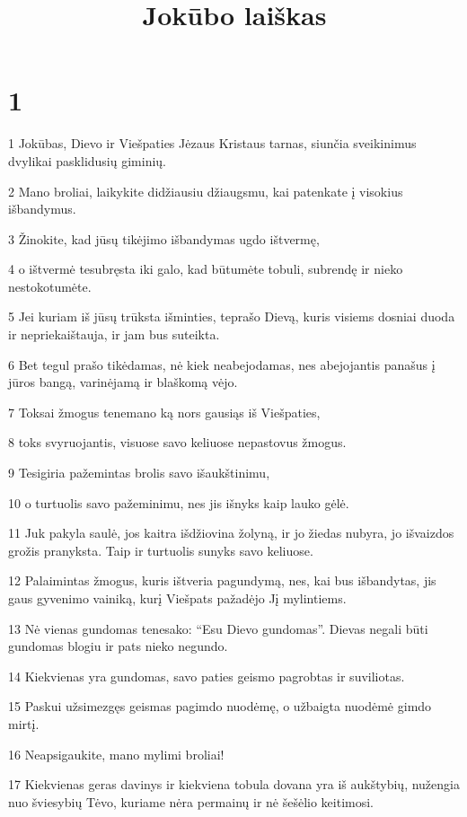 

\title{Jokūbo laiškas}


\chapter{1}


\par 1 Jokūbas, Dievo ir Viešpaties Jėzaus Kristaus tarnas, siunčia sveikinimus dvylikai pasklidusių giminių. 
\par 2 Mano broliai, laikykite didžiausiu džiaugsmu, kai patenkate į visokius išbandymus. 
\par 3 Žinokite, kad jūsų tikėjimo išbandymas ugdo ištvermę, 
\par 4 o ištvermė tesubręsta iki galo, kad būtumėte tobuli, subrendę ir nieko nestokotumėte. 
\par 5 Jei kuriam iš jūsų trūksta išminties, teprašo Dievą, kuris visiems dosniai duoda ir nepriekaištauja, ir jam bus suteikta. 
\par 6 Bet tegul prašo tikėdamas, nė kiek neabejodamas, nes abejojantis panašus į jūros bangą, varinėjamą ir blaškomą vėjo. 
\par 7 Toksai žmogus tenemano ką nors gausiąs iš Viešpaties,­ 
\par 8 toks svyruojantis, visuose savo keliuose nepastovus žmogus. 
\par 9 Tesigiria pažemintas brolis savo išaukštinimu, 
\par 10 o turtuolis savo pažeminimu, nes jis išnyks kaip lauko gėlė. 
\par 11 Juk pakyla saulė, jos kaitra išdžiovina žolyną, ir jo žiedas nubyra, jo išvaizdos grožis pranyksta. Taip ir turtuolis sunyks savo keliuose. 
\par 12 Palaimintas žmogus, kuris ištveria pagundymą, nes, kai bus išbandytas, jis gaus gyvenimo vainiką, kurį Viešpats pažadėjo Jį mylintiems. 
\par 13 Nė vienas gundomas tenesako: “Esu Dievo gundomas”. Dievas negali būti gundomas blogiu ir pats nieko negundo. 
\par 14 Kiekvienas yra gundomas, savo paties geismo pagrobtas ir suviliotas. 
\par 15 Paskui užsimezgęs geismas pagimdo nuodėmę, o užbaigta nuodėmė gimdo mirtį. 
\par 16 Neapsigaukite, mano mylimi broliai! 
\par 17 Kiekvienas geras davinys ir kiekviena tobula dovana yra iš aukštybių, nužengia nuo šviesybių Tėvo, kuriame nėra permainų ir nė šešėlio keitimosi. 
